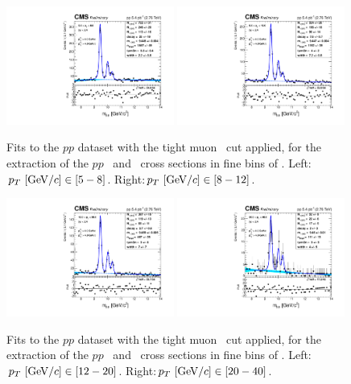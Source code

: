 \begin{figure}
  \includegraphics[width=0.49\textwidth]{Chapters/aYield/pp/pt_4_4/Pt/Pt_5_8/pp2p76tev_Pt_5_8_fsr1.pdf}  
  \includegraphics[width=0.49\textwidth]{Chapters/aYield/pp/pt_4_4/Pt/Pt_8_12/pp2p76tev_Pt_8_12_fsr1.pdf}  
  \caption{Fits to the $pp$ dataset with the tight muon \pt\ cut
    applied, for the extraction of the $pp$ \PgUb\ and \PgUc\ cross
    sections in fine bins of \pt. Left:$p_{T}~[{\rm GeV}/c]\in [5 - 8]$. Right:$p_{T}~[{\rm GeV}/c]\in [8 - 12]$.}
  \label{fig:YieldsErfExp_2S3Sb} 
\end{figure}
\begin{figure}
  \includegraphics[width=0.49\textwidth]{Chapters/aYield/pp/pt_4_4/Pt/Pt_12_20/pp2p76tev_Pt_12_20_fsr1.pdf}  
  \includegraphics[width=0.49\textwidth]{Chapters/aYield/pp/pt_4_4/Pt/Pt_20_40/pp2p76tev_Pt_20_40_fsr1.pdf}  
  \caption{Fits to the $pp$ dataset with the tight muon \pt\ cut
    applied, for the extraction of the $pp$ \PgUb\ and \PgUc\ cross
    sections in fine bins of \pt. Left:$p_{T}~[{\rm GeV}/c]\in [12 - 20]$. Right:$p_{T}~[{\rm GeV}/c]\in [20 - 40]$.}
  \label{fig:YieldsErfExp_2S3Sc} 
\end{figure}
